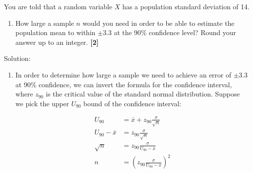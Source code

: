 \documentclass[a4paper, leqno, 12pt]{article} %
\newenvironment{top_enumerate}{
\begin{enumerate}
  \setlength{\itemsep}{2em}
  \setlength{\topsep}{-0pt}
  \setlength{\partopsep}{-0pt}
}{\end{enumerate}}
\begin{document}
\begin{top_enumerate}
\begin{enumerate}
	\begin{center}
	\end{center}
	 \quad \textbf{}
\end{enumerate}\newpage
\item You are told that a random variable $X$ has a population standard deviation of {14}.
 
\setcounter{equation}{0}  %
\begin{enumerate}
	\setlength{\topsep}{-0pt}
	\setlength{\partopsep}{-0pt}
	\setlength{\itemsep}{10pt}
			\item How large a sample $n$ would you need in order to be able to estimate the population mean to within $\pm${3.3} at the {90}\% confidence level? Round your answer up to an integer.
	 \quad \textbf{[2]}
\end{enumerate}\addtocounter{enumi}{-1}
\item Solution:
 
\setcounter{equation}{0}  %
\begin{enumerate}
	\setlength{\topsep}{-0pt}
	\setlength{\partopsep}{-0pt}
	\setlength{\itemsep}{10pt}
			\item In order to determine how large a sample we need to achieve an error of $\pm${3.3} at {90}\% confidence, we can invert the formula for the confidence interval, where $z_{{90}}$ is the critical value of the standard normal distribution. Suppose we pick the upper $U_{{90}}$ bound of the confidence interval:
	
	\[
	\begin{aligned}
	U_{{90}} & = \bar x + z_{{90}} \frac{\sigma}{\sqrt{n}}\\
	U_{{90}} - \bar x  & = z_{{90}} \frac{\sigma}{\sqrt{n}}\\
	\sqrt{n} & =z_{{90}} \frac{\sigma}{U_{{90}} - \bar x} \\
	n & = \left(z_{{90}} \frac{\sigma}{U_{{90}} - \bar x}\right)^2 \\
	\end{aligned}
	\]
	

\end{enumerate}
\end{top_enumerate}
\end{document}
